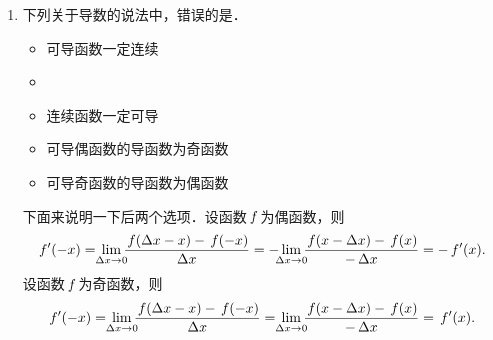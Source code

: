 \begin{enumerate}
\item 下列关于导数的说法中，错误的是\uline{\hspace{10em}}．
  \begin{itemize}
    \renewcommand{\labelitemi}{\faCircleThin}
  \item 可导函数一定连续
    \ifshowsol
    \item[\faCircle]
    \else
    \item
    \fi
    连续函数一定可导
  \item 可导偶函数的导函数为奇函数
  \item 可导奇函数的导函数为偶函数
  \end{itemize}

  \ifshowsol
    下面来说明一下后两个选项．设函数\(\,f\mkern2mu\)为偶函数，则
    \begin{equation*}
      f'(-x)
      = \,\lim_{\mathclap{\fdx \to 0}} \frac{\,f(\fdx-x) - \,f(-x)}{\fdx}
      = - \lim_{\mathclap{\fdx \to 0}} \frac{\,f(x-\fdx) - \,f(x)}{-\fdx}
      = - \,f'(x).
    \end{equation*}
    设函数\(\,f\mkern2mu\)为奇函数，则
    \begin{equation*}
      f'(-x)
      = \,\lim_{\mathclap{\fdx \to 0}} \frac{\,f(\fdx-x) - \,f(-x)}{\fdx}
      = \,\lim_{\mathclap{\fdx \to 0}} \frac{\,f(x-\fdx) - \,f(x)}{-\fdx}
      = \,f'(x).
    \end{equation*}
  \fi


\end{enumerate}
